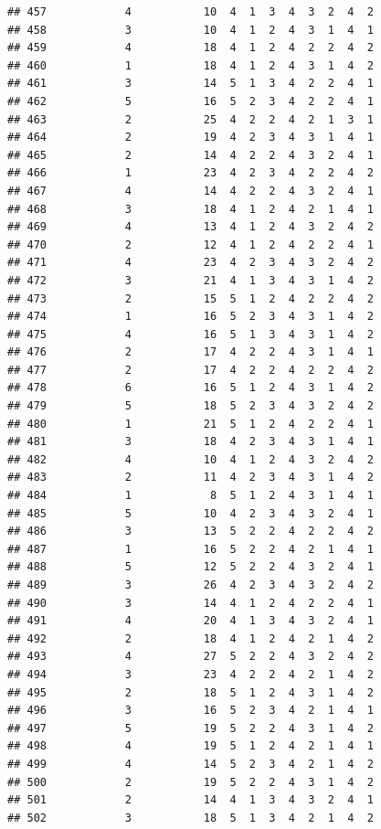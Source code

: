 \documentclass[12pt,]{krantz}
\theoremstyle{definition}
\theoremstyle{definition}
\theoremstyle{remark}
\begin{document}
\begin{verbatim}
## 457            4           10  4  1  3  4  3  2  4  2
## 458            3           10  4  1  2  4  3  1  4  1
## 459            4           18  4  1  2  4  2  2  4  2
## 460            1           18  4  1  2  4  3  1  4  2
## 461            3           14  5  1  3  4  2  2  4  1
## 462            5           16  5  2  3  4  2  2  4  1
## 463            2           25  4  2  2  4  2  1  3  1
## 464            2           19  4  2  3  4  3  1  4  1
## 465            2           14  4  2  2  4  3  2  4  1
## 466            1           23  4  2  3  4  2  2  4  2
## 467            4           14  4  2  2  4  3  2  4  1
## 468            3           18  4  1  2  4  2  1  4  1
## 469            4           13  4  1  2  4  3  2  4  2
## 470            2           12  4  1  2  4  2  2  4  1
## 471            4           23  4  2  3  4  3  2  4  2
## 472            3           21  4  1  3  4  3  1  4  2
## 473            2           15  5  1  2  4  2  2  4  2
## 474            1           16  5  2  3  4  3  1  4  2
## 475            4           16  5  1  3  4  3  1  4  2
## 476            2           17  4  2  2  4  3  1  4  1
## 477            2           17  4  2  2  4  2  2  4  2
## 478            6           16  5  1  2  4  3  1  4  2
## 479            5           18  5  2  3  4  3  2  4  2
## 480            1           21  5  1  2  4  2  2  4  1
## 481            3           18  4  2  3  4  3  1  4  1
## 482            4           10  4  1  2  4  3  2  4  2
## 483            2           11  4  2  3  4  3  1  4  2
## 484            1            8  5  1  2  4  3  1  4  1
## 485            5           10  4  2  3  4  3  2  4  1
## 486            3           13  5  2  2  4  2  2  4  2
## 487            1           16  5  2  2  4  2  1  4  1
## 488            5           12  5  2  2  4  3  2  4  1
## 489            3           26  4  2  3  4  3  2  4  2
## 490            3           14  4  1  2  4  2  2  4  1
## 491            4           20  4  1  3  4  3  2  4  1
## 492            2           18  4  1  2  4  2  1  4  2
## 493            4           27  5  2  2  4  3  2  4  2
## 494            3           23  4  2  2  4  2  1  4  2
## 495            2           18  5  1  2  4  3  1  4  2
## 496            3           16  5  2  3  4  2  1  4  1
## 497            5           19  5  2  2  4  3  1  4  2
## 498            4           19  5  1  2  4  2  1  4  1
## 499            4           14  5  2  3  4  2  1  4  2
## 500            2           19  5  2  2  4  3  1  4  2
## 501            2           14  4  1  3  4  3  2  4  1
## 502            3           18  5  1  3  4  2  1  4  2

\end{verbatim}
\end{document}
